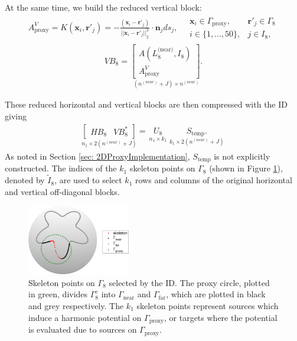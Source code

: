 \documentclass{sfuthesis}
\begin{document}
At the same time, we build the reduced vertical block:
\begin{align*}
	A_{\text{proxy}}^V=K(\mathbf{x}_i, \mathbf{r}'_j)=-\frac{(\mathbf{x}_i-\mathbf{r}'_j)}{{||\mathbf{x}_i-\mathbf{r}'_j||}_2^2}\cdot \mathbf{n}_j ds_j, \quad \begin{array}{cc} 
	\mathbf{x}_i \in \Gamma_{\text{proxy}}, &\mathbf{r}'_j \in \Gamma_8\\
	i \in \{1, ..., 50\}, &j \in I_8,
	\end{array}
\end{align*}
\begin{align*}
	VB_8=\underset{(n^{(near)}+J) \times n^{(near)} }{\left[\begin{array}{c}
	A(L_8^{\text{(near)}}, I_8)\\
	A_{\text{proxy}}^V
	\end{array}\right].}
\end{align*}

These reduced  horizontal and vertical blocks are then compressed with the ID giving 
\begin{align*}
	\underset{n_1 \times 2(n^{(near)}+J)}{\left[\begin{array}{cc}
	HB_8& VB_8^*
	\end{array}\right]}=\underset{ \ n_1 \times k_1 \ }{U_8} \underset{ \ k_1 \times 2(n^{(near)} +J) \ }{S_{\text{temp}}.}
\end{align*}
As noted in Section \ref{sec: 2DProxyImplementation}, $S_{\text{temp}}$ is not explicitly constructed. The indices of the $k_1$ skeleton points on $\Gamma_8$ (shown in Figure  \ref{fig: ProxyRecLev1Block8}), denoted by $\tilde{I}_8$, are used to select $k_1$ rows and columns of the original horizontal and vertical off-diagonal blocks. 
\begin{figure}[h]
	\centering
  	\includegraphics[width=0.4\textwidth]{ProxyRecLev1Block8}
 	\caption{Skeleton points on $\Gamma_8$ selected by the ID. The proxy circle, plotted in green, divides $\Gamma_8^c$ into $\Gamma_{\text{near}}$ and $\Gamma_{\text{far}}$, which are plotted in black and grey respectively. The $k_1$ skeleton points represent sources which induce a harmonic potential on $\Gamma_{\text{proxy}}$, or targets where the potential is evaluated due to sources on $\Gamma_{\text{proxy}}$. }
	\label{fig: ProxyRecLev1Block8}
\end{figure}
\end{document}
